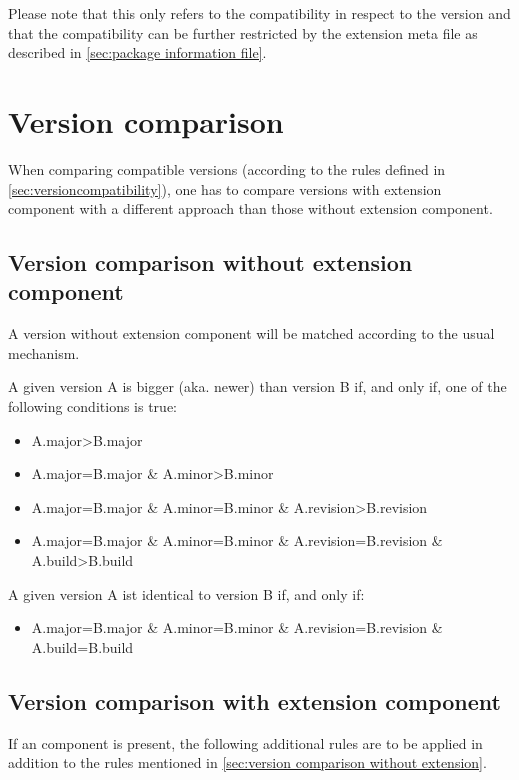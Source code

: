 Please note that this only refers to the compatibility in respect to the version and that the compatibility can be further restricted by the extension meta file as described in \ref{sec:package information file}.

\section[sec:version comparison]{Version comparison}

When comparing compatible versions (according to the rules defined in \ref{sec:versioncompatibility}), one has to compare versions with extension component with a different approach than those without extension component.

\subsection[sec:version comparison without extension]{Version comparison without extension component}
A version without extension component will be matched according to the usual mechanism.

A given version A is bigger (aka. newer) than version B if, and only if, one of the following conditions is true:
\begin{itemize}
\item A.major>B.major
\item A.major=B.major \& A.minor>B.minor
\item A.major=B.major \& A.minor=B.minor \& A.revision>B.revision
\item A.major=B.major \& A.minor=B.minor \& A.revision=B.revision \& A.build>B.build
\end{itemize}

A given version A ist identical to version B if, and only if:
\begin{itemize}
\item A.major=B.major \& A.minor=B.minor \& A.revision=B.revision \& A.build=B.build
\end{itemize}

\subsection[sec:version comparison with extension]{Version comparison with extension component}

If an  component is present, the following additional rules are to be applied in addition to the rules mentioned in \ref{sec:version comparison without extension}.

